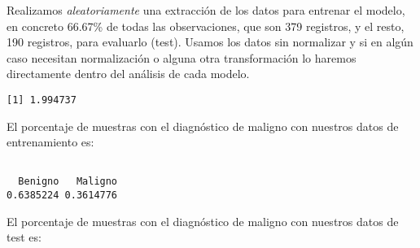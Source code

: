 \documentclass[
]{article}
\newenvironment{Shaded}{\begin{snugshade}}{\end{snugshade}}
\newcommand{\CommentTok}[1]{\textcolor[rgb]{0.56,0.35,0.01}{\textit{#1}}}
\newcommand{\DecValTok}[1]{\textcolor[rgb]{0.00,0.00,0.81}{#1}}
\newcommand{\KeywordTok}[1]{\textcolor[rgb]{0.13,0.29,0.53}{\textbf{#1}}}
\newcommand{\NormalTok}[1]{#1}
\newcommand{\OperatorTok}[1]{\textcolor[rgb]{0.81,0.36,0.00}{\textbf{#1}}}
\newcommand{\StringTok}[1]{\textcolor[rgb]{0.31,0.60,0.02}{#1}}
\begin{document}
Realizamos \emph{aleatoriamente} una extracción de los datos para
entrenar el modelo, en concreto 66.67\% de todas las observaciones, que
son 379 registros, y el resto, 190 registros, para evaluarlo (test).
Usamos los datos sin normalizar y si en algún caso necesitan
normalización o alguna otra transformación lo haremos directamente
dentro del análisis de cada modelo.

\begin{Shaded}
\end{Shaded}

\begin{verbatim}
[1] 1.994737
\end{verbatim}

El porcentaje de muestras con el diagnóstico de maligno con nuestros
datos de entrenamiento es:

\begin{Shaded}
\end{Shaded}

\begin{verbatim}

  Benigno   Maligno 
0.6385224 0.3614776 
\end{verbatim}

El porcentaje de muestras con el diagnóstico de maligno con nuestros
datos de test es:
\end{document}
